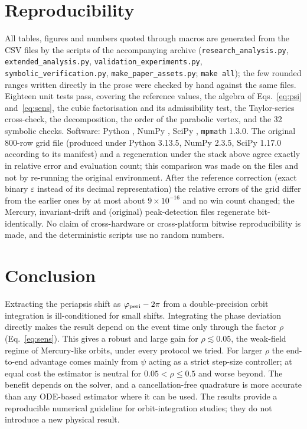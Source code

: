 \documentclass[11pt,a4paper]{article}
\begin{document}
\section{Reproducibility}
\label{sec:repro}
All tables, figures and numbers quoted through macros are generated from the CSV files by the scripts of the accompanying archive (\texttt{research\_analysis.py}, \texttt{extended\_analysis.py}, \texttt{validation\_experiments.py}, \texttt{symbolic\_verification.py}, \texttt{make\_paper\_assets.py}; \texttt{make all}); the few rounded ranges written directly in the prose were checked by hand against the same files. Eighteen unit tests pass, covering the reference values, the algebra of Eqs.~\eqref{eq:psi} and~\eqref{eq:sens}, the cubic factorisation and its admissibility test, the Taylor-series cross-check, the decomposition, the order of the parabolic vertex, and the 32 symbolic checks. Software: Python \PyVer, NumPy \NumpyVer, SciPy \ScipyVer, \texttt{mpmath} 1.3.0. The original 800-row grid file (produced under Python 3.13.5, NumPy 2.3.5, SciPy 1.17.0 according to its manifest) and a regeneration under the stack above agree exactly in relative error and evaluation count; this comparison was made on the files and not by re-running the original environment. After the reference correction (exact binary $\varepsilon$ instead of its decimal representation) the relative errors of the grid differ from the earlier ones by at most about $9\times10^{-16}$ and no win count changed; the Mercury, invariant-drift and (original) peak-detection files regenerate bit-identically. No claim of cross-hardware or cross-platform bitwise reproducibility is made, and the deterministic scripts use no random numbers.

\section{Conclusion}
Extracting the periapsis shift as $\varphi_{\rm peri}-2\pi$ from a double-precision orbit integration is ill-conditioned for small shifts. Integrating the phase deviation directly makes the result depend on the event time only through the factor $\rho$ (Eq.~\eqref{eq:sens}). This gives a robust and large gain for $\rho\lesssim0.05$, the weak-field regime of Mercury-like orbits, under every protocol we tried. For larger $\rho$ the end-to-end advantage comes mainly from $\psi$ acting as a strict step-size controller; at equal cost the estimator is neutral for $0.05<\rho\le0.5$ and worse beyond. The benefit depends on the solver, and a cancellation-free quadrature is more accurate than any ODE-based estimator where it can be used. The results provide a reproducible numerical guideline for orbit-integration studies; they do not introduce a new physical result.
\end{document}

